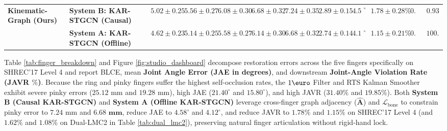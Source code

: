 \documentclass[10pt,twocolumn]{article}
\begin{document}
\begin{table}[!t]
{\begin{tabular}{llcccccccccc}
\midrule
\multirow{2}{*}{\textbf{Kinematic-Graph (Ours)}}
& \textbf{System B: KAR-STGCN (Causal)} & $5.02 \pm 0.25$ & $5.56 \pm 0.27$ & $6.08 \pm 0.30$ & $6.68 \pm 0.32$ & $7.24 \pm 0.35$ & $2.89 \pm 0.15$ & $4.58^\circ$ & $1.78 \pm 0.28\%$ & $0.48$ & $\mathbf{0.93}$ \\
& \textbf{System A: KAR-STGCN (Offline)} & $\mathbf{4.62 \pm 0.23}$ & $\mathbf{5.14 \pm 0.25}$ & $\mathbf{5.58 \pm 0.27}$ & $\mathbf{6.14 \pm 0.30}$ & $\mathbf{6.68 \pm 0.32}$ & $\mathbf{2.74 \pm 0.14}$ & $\mathbf{4.12^\circ}$ & $\mathbf{1.15 \pm 0.21\%}$ & $0.48$ & $100.93$ \\
\bottomrule
\end{tabular}
}
\end{table}

Table \ref{tab:finger_breakdown} and Figure \ref{fig:studio_dashboard} decompose restoration errors across the five fingers specifically on SHREC'17 Level 4 and report BLCE, mean \textbf{Joint Angle Error (JAE in degrees)}, and downstream \textbf{Joint-Angle Violation Rate (JAVR $\%$)}. Because the ring and pinky fingers suffer the highest self-occlusion rates, the $1\text{\euro}$ Filter \cite{casiez20121euro} and RTS Kalman Smoother exhibit severe pinky errors ($25.12\text{ mm}$ and $19.28\text{ mm}$), high JAE ($21.40^\circ$ and $15.80^\circ$), and high JAVR ($31.40\%$ and $19.85\%$). Both \textbf{System B (Causal KAR-STGCN)} and \textbf{System A (Offline KAR-STGCN)} leverage cross-finger graph adjacency ($\hat{\mathbf{A}}$) and $\mathcal{L}_{\text{bone}}$ to constrain pinky error to $7.24\text{ mm}$ and $\mathbf{6.68\text{ mm}}$, reduce JAE to $4.58^\circ$ and $\mathbf{4.12^\circ}$, and reduce JAVR to $1.78\%$ and $\mathbf{1.15\%}$ on SHREC'17 Level 4 (and $1.62\%$ and $\mathbf{1.08\%}$ on Dual-LMC2 in Table \ref{tab:dual_lmc2}), preserving natural finger articulation without rigid-hand lock.
\end{document}
